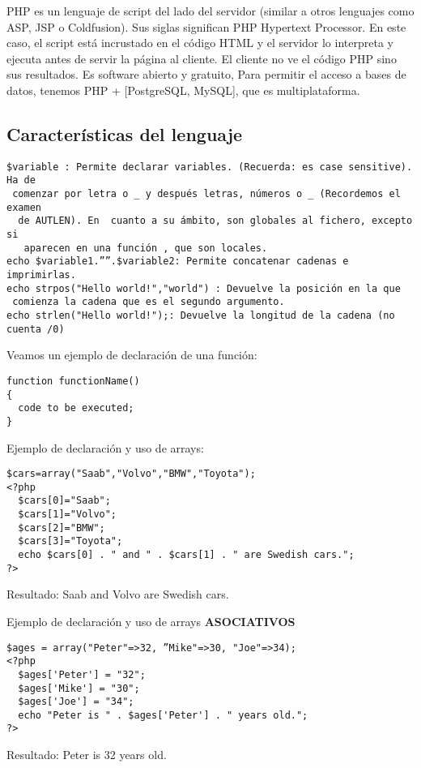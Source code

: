\documentclass{apuntes}
\begin{document}
PHP es un lenguaje de script del lado del servidor (similar a otros lenguajes como ASP, JSP o Coldfusion). Sus siglas significan PHP Hypertext Processor. En este caso, el script está incrustado en el código HTML y el servidor lo interpreta y ejecuta antes de servir la página al cliente. El cliente no ve el código PHP sino sus resultados. Es software abierto y gratuito, Para permitir el acceso a bases de datos, tenemos PHP + [PostgreSQL, MySQL], que es multiplataforma.

\subsection{Características del lenguaje}
\begin{verbatim}
$variable : Permite declarar variables. (Recuerda: es case sensitive). Ha de
 comenzar por letra o _ y después letras, números o _ (Recordemos el examen
  de AUTLEN). En  cuanto a su ámbito, son globales al fichero, excepto si
   aparecen en una función , que son locales.
echo $variable1.””.$variable2: Permite concatenar cadenas e imprimirlas.
echo strpos("Hello world!","world") : Devuelve la posición en la que
 comienza la cadena que es el segundo argumento.
echo strlen("Hello world!");: Devuelve la longitud de la cadena (no cuenta /0)
\end{verbatim}

Veamos un ejemplo de declaración de una función:
\begin{verbatim}
function functionName()
{
  code to be executed;
}
\end{verbatim}

Ejemplo de declaración y uso de arrays:
\begin{verbatim}
$cars=array("Saab","Volvo","BMW","Toyota");
<?php
  $cars[0]="Saab";
  $cars[1]="Volvo";
  $cars[2]="BMW";
  $cars[3]="Toyota";
  echo $cars[0] . " and " . $cars[1] . " are Swedish cars.";
?>
\end{verbatim}
Resultado: Saab and Volvo are Swedish cars.

Ejemplo de declaración y uso de arrays \textbf{ASOCIATIVOS}
\begin{verbatim}
$ages = array("Peter"=>32, ”Mike"=>30, "Joe"=>34);
<?php
  $ages['Peter'] = "32";
  $ages['Mike'] = "30";
  $ages['Joe'] = "34";
  echo "Peter is " . $ages['Peter'] . " years old.";
?>
\end{verbatim}
Resultado: Peter is 32 years old.
\end{document}
